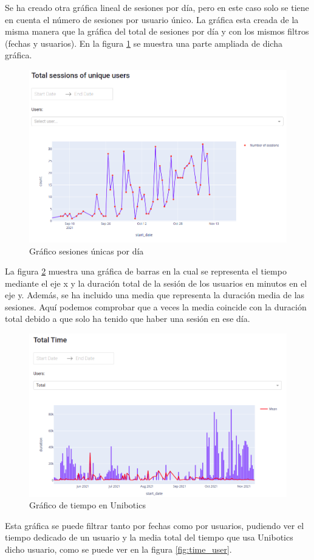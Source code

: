 Se ha creado otra gráfica lineal de sesiones por día, pero en este caso solo se tiene en cuenta el número de sesiones por usuario único. La gráfica esta creada de la misma manera que la gráfica del total de sesiones por día y con los mismos filtros (fechas y usuarios). En la figura \ref{fig:sesion_users}  se muestra una parte ampliada de dicha gráfica.\\

\begin{figure}[H]
    \centering
    \includegraphics[width=18cm, keepaspectratio]{img/sesion_users.png}
    \caption{Gráfico sesiones únicas por día}
    \label{fig:sesion_users}
\end{figure}
\newpage
La figura \ref{fig:time} muestra una gráfica de barras en la cual se representa el tiempo mediante el eje x y la duración total de la sesión de los usuarios en minutos en el eje y. Además, se ha incluido una media que representa la duración media de las sesiones. Aquí podemos comprobar que a veces la media coincide con la duración total debido a que solo ha tenido que haber una sesión en ese día.



\begin{figure}[H]
    \centering
    \includegraphics[width=18cm, keepaspectratio]{img/time.png}
    \caption{Gráfico de tiempo en Unibotics}
    \label{fig:time}
\end{figure}
Esta gráfica se puede filtrar tanto por fechas como por usuarios, pudiendo ver el tiempo dedicado de un usuario y la media total del tiempo que usa Unibotics dicho usuario, como se puede ver en la figura \ref{fig:time_user}.


